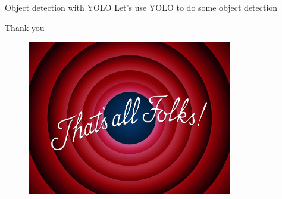 \documentclass[tikz,table,border=2mm]{beamer}
\begin{document}
\begin{frame}{Object detection with YOLO}
Let's use YOLO to do some object detection
\end{frame}

\begin{frame}{Thank you}
\begin{figure}[ht]
    \centering
    \includegraphics[width=0.8\textwidth]{images/end.png}
\end{figure}
\end{frame}
\end{document}
